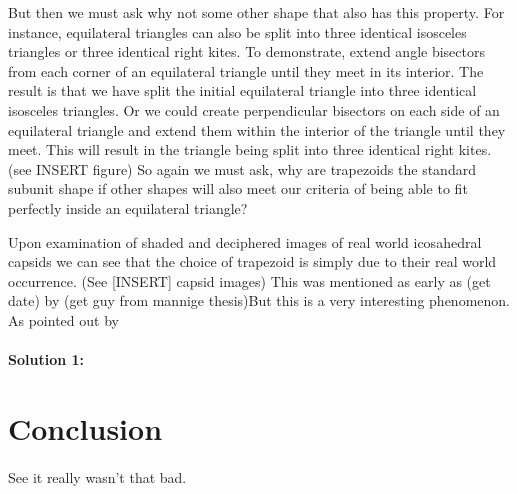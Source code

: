 \documentclass[12pt,letter]{article}
\begin{document}
But then we must ask why not some other shape that also has this property. For instance, equilateral triangles can also be split into three identical isosceles triangles or three identical right kites. To demonstrate, extend angle bisectors from each corner of an equilateral triangle until they meet in its interior. The result is that we have split the initial equilateral triangle into three identical isosceles triangles. Or we could create perpendicular bisectors on each side of an equilateral triangle and extend them within the interior of the triangle until they meet. This will result in the triangle being split into three identical right kites. (see INSERT figure) So again we must ask, why are trapezoids the standard subunit shape if other shapes will also meet our criteria of being able to fit perfectly inside an equilateral triangle?

Upon examination of shaded and deciphered images of real world icosahedral capsids we can see that the choice of trapezoid is simply due to their real world occurrence. (See [INSERT] capsid images) This was mentioned as early as (get date) by (get guy from mannige thesis)But this is a very interesting phenomenon. As pointed out by 

\paragraph{Solution 1:}


\section{Conclusion}
\paragraph{}
See it really wasn't that bad.

\newpage


\end{document}
